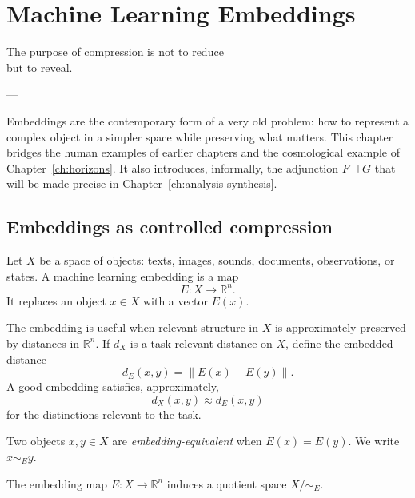 
\chapter{Machine Learning Embeddings}
\label{ch:embeddings}

\epigraph{%
  The purpose of compression is not to reduce\\
  but to reveal.%
}{---}

\begin{WhyMatters}
  Embeddings are the contemporary form of a very old problem:
  how to represent a complex object in a simpler space while
  preserving what matters.
  This chapter bridges the human examples of earlier chapters
  and the cosmological example of Chapter~\ref{ch:horizons}.
  It also introduces, informally, the adjunction $F \dashv G$
  that will be made precise in Chapter~\ref{ch:analysis-synthesis}.
\end{WhyMatters}

\section{Embeddings as controlled compression}

Let $X$ be a space of objects: texts, images, sounds, documents,
observations, or states.
A machine learning embedding is a map
\[
  E : X \to \mathbb{R}^n.
\]
It replaces an object $x \in X$ with a vector $E(x)$.

The embedding is useful when relevant structure in $X$ is
approximately preserved by distances in $\mathbb{R}^n$.
If $d_X$ is a task-relevant distance on $X$, define the
embedded distance
\[
  d_E(x, y) = \|E(x) - E(y)\|.
\]
A good embedding satisfies, approximately,
\[
  d_X(x, y) \approx d_E(x, y)
\]
for the distinctions relevant to the task.

\begin{definition}
  Two objects $x, y \in X$ are \emph{embedding-equivalent}
  when $E(x) = E(y)$.
  We write $x \sim_E y$.
\end{definition}

\begin{proposition}
  The embedding map $E : X \to \mathbb{R}^n$ induces a quotient
  space $X / {\sim_E}$.
\end{proposition}

